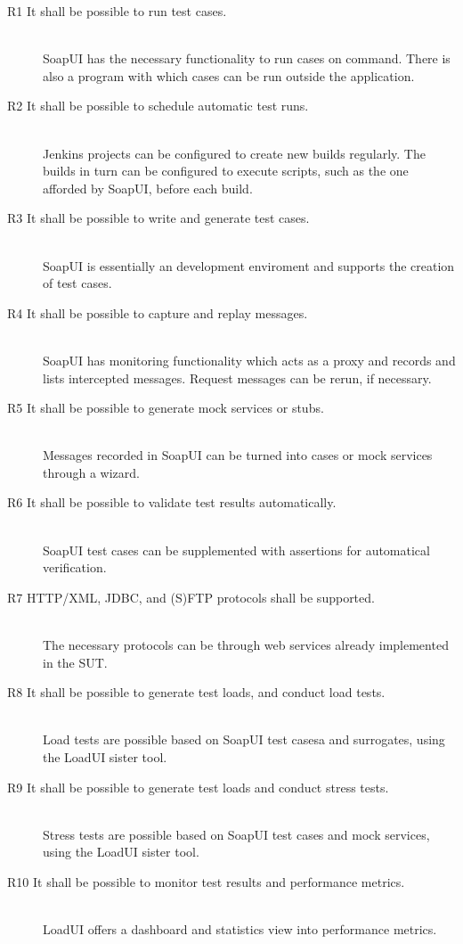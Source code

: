 \documentclass[12pt,a4paper,oneside,pdftex]{report}
\begin{document}
{\begin{description}
  \item[R1 It shall be possible to run test cases.] \hfill \\
 SoapUI has the necessary functionality to run cases on command. There is also a program with which cases can be run outside the application.
  \item[R2 It shall be possible to schedule automatic test runs.] \hfill \\
  Jenkins projects can be configured to create new builds regularly. The builds in turn can be configured to execute scripts, such as the one afforded by SoapUI, before each build.
  \item[R3 It shall be possible to write and generate test cases.] \hfill \\
  SoapUI is essentially an development enviroment and supports the creation of test cases.
  \item[R4 It shall be possible to capture and replay messages.] \hfill \\
  SoapUI has monitoring functionality which acts as a proxy and records and lists intercepted messages. Request messages can be rerun, if necessary.
  \item[R5 It shall be possible to generate mock services or stubs.] \hfill \\
  Messages recorded in SoapUI can be turned into cases or mock services through a wizard.
  \item[R6 It shall be possible to validate test results automatically.] \hfill \\
  SoapUI test cases can be supplemented with assertions for automatical verification.
  \item[R7 HTTP/XML, JDBC, and (S)FTP protocols shall be supported.]  \hfill \\
  The necessary protocols can be through web services already implemented in the SUT.
  \item[R8 It shall be possible to generate test loads, and conduct load tests.] \hfill \\
   Load tests are possible based on SoapUI test casesa and surrogates, using the LoadUI sister tool.
  \item[R9 It shall be possible to generate test loads and conduct stress tests.] \hfill \\
   Stress tests are possible based on SoapUI test cases and mock services, using the LoadUI sister tool.
  \item[R10 It shall be possible to monitor test results and performance metrics.] \hfill \\
 LoadUI offers a dashboard and statistics view into performance metrics.
\end{description}

}
\end{document}
